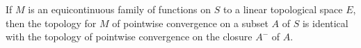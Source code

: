 If $M$ is an equicontinuous family of functions on $S$ to a linear topological space $E$, then the topology for $M$ of pointwise convergence on a subset $A$ of $S$ is identical with the topology of pointwise convergence on the closure $A^{-}$ of $A$.
